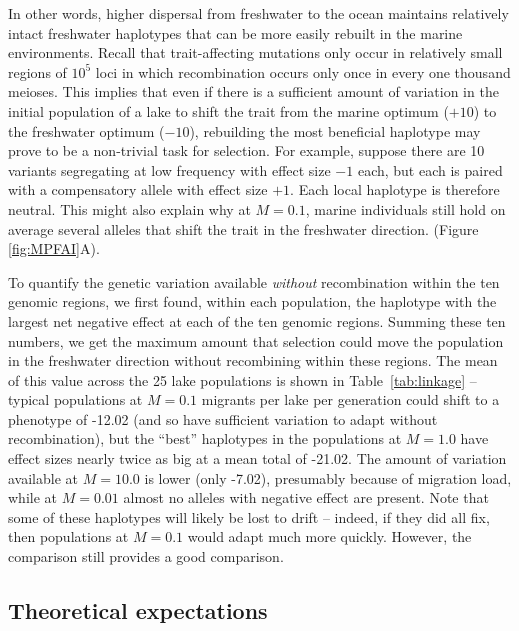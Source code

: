 \documentclass{article}
\newcommand{\plr}[1]{\todo[linecolor=blue,backgroundcolor=blue!25,bordercolor=blue]{#1}}
\begin{document}
\plr{cite \citet{yeaman2011genetic}?}

In other words, higher dispersal from freshwater to the ocean maintains relatively intact freshwater haplotypes that can be more easily rebuilt in the marine environments. Recall that trait-affecting mutations only occur in relatively small regions of $10^5$ loci in which recombination occurs only once in every one thousand meioses. This implies that even if there is a sufficient amount of variation in the initial population of a lake to shift the trait from the marine optimum ($+10$) to the freshwater optimum ($-10$), rebuilding the most beneficial haplotype may prove to be a non-trivial task for selection.
For example, suppose there are 10 variants segregating at low frequency with effect size $-1$ each, but each is paired with a compensatory allele with effect size $+1$. Each local haplotype is therefore neutral. This might also explain why at $M=0.1$, marine individuals still hold on average several alleles that shift the trait in the freshwater direction.
(Figure \ref{fig:MPFAI}A).

To quantify the genetic variation available \emph{without} recombination within the ten genomic regions, we first found, within each population, the haplotype with the largest net negative effect at each of the ten genomic regions. Summing these ten numbers, we get the maximum amount that selection could move the population in the freshwater direction without recombining {within} these regions. The mean of this value across the 25 lake populations is shown in Table~\ref{tab:linkage} -- typical populations at $M=0.1$ migrants per lake per generation could shift to a phenotype of -12.02
(and so have sufficient variation to adapt without recombination), but the ``best'' haplotypes in the populations at $M=1.0$ have effect sizes nearly twice as big at a mean total of -21.02.
The amount of variation available at $M=10.0$ is lower (only -7.02), presumably because of migration load, while at $M=0.01$ almost no alleles with negative effect are present.
Note that some of these haplotypes will likely be lost to drift -- indeed, if they did all fix, then populations at $M=0.1$ would adapt much more quickly. However, the comparison still provides a good comparison.

\subsection*{Theoretical expectations}
\end{document}
